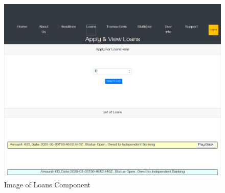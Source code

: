 \begin{figure}[H]
\includegraphics[width=\textwidth]{img/loanscomponent.png}
\caption{Image of Loans Component}
\label{fig:Image of loans component}
\end{figure}
